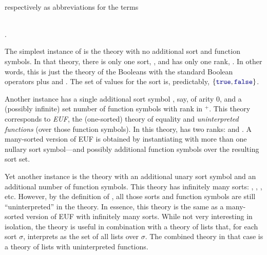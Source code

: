 \begin{center}
\qquad {}
\qquad {} \\
\end{center}

\noindent respectively as abbreviations for the terms

\begin{center}
\qquad {}
\qquad {} \\
\qquad {} .
\end{center}


The simplest instance of  is the theory with no additional sort
and function symbols.
In that theory, there is only one sort, ,
and  has only one rank, .
In other words, this is just the theory of the Booleans with the standard Boolean operators
plus  and .
The set of values for the  sort is, predictably, $\{\ter{true},\ter{false}\}$.

Another instance has a single additional sort symbol , say, 
of arity 0, and a (possibly infinite) set number of function symbols 
with rank in $\!^+$.
This theory corresponds to \emph{EUF}, 
the (one-sorted) theory of equality and \emph{uninterpreted functions}
(over those function symbols).
In this theory,  has two ranks:
 and .
A many-sorted version of EUF is obtained by instantiating 
with more than one nullary sort symbol---and possibly additional
function symbols over the resulting sort set. 

Yet another instance is the theory with an additional unary sort symbol 
and an additional number of function symbols.
This theory has infinitely many sorts:
, ,  , etc.
However, by the definition of ,
all those sorts and function symbols are still ``uninterpreted'' in the theory.
In essence, 
this theory is the same as a many-sorted version of EUF with infinitely many sorts.
While not very interesting in isolation,
the theory is useful in combination with a theory of lists that,
for each sort $\sigma$, 
interprets  as the set of all lists over $\sigma$.
The combined theory in that case is a theory of lists with uninterpreted
functions.

